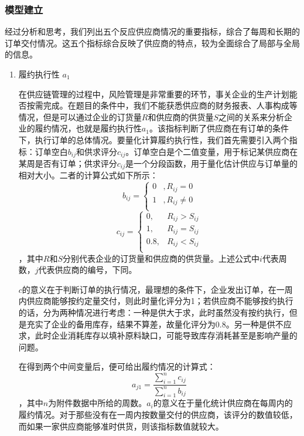 \documentclass{my_paper}
\begin{document}
\subsubsection{模型建立}
经过分析和思考，我们列出五个反应供应商情况的重要指标，综合了每周和长期的订单交付情况。这五个指标综合反映了供应商的特点，较为全面综合了局部与全局的信息。

\begin{enumerate}
    \item 履约执行性 $a_1$
    
    在供应链管理的过程中，风险管理\cite{1}是非常重要的环节，事关企业的生产计划能否按需完成。在题目的条件中，我们不能获悉供应商的财务报表、人事构成等情况，但是可以通过企业的订货量$R$和供应商的供货量$S$之间的关系来分析企业的履约情况，也就是履约执行性$a_1$。该指标判断了供应商在有订单的条件下，执行订单的总体情况。要量化计算履约执行性，我们首先需要引入两个指标：订单空白$b_{ij}$和供求评分$c_{ij}$。订单空白是个二值变量，用于标记某供应商在某周是否有订单；供求评分$c_{ij}$是一个分段函数，用于量化估计供应与订单量的相对大小。二者的计算公式如下所示：
    \begin{equation}
    b_{ij} = \begin{cases}
        0&,R_{ij}=0\\
        1&,R_{ij}\neq 0\\
    \end{cases}
    \label{bij}
    \end{equation}
    \begin{equation}
    c_{ij}=\begin{cases}
        0,&R_{ij}>S_{ij}\\
        1,&R_{ij}=S_{ij}\\
        0.8,&R_{ij}<S_{ij}\\
    \end{cases}
    \label{cij}
    \end{equation}
    ，其中$R$和$S$分别代表企业的订货量和供应商的供货量。上述公式中$i$代表周数，$j$代表供应商的编号，下同。
    
    $c$的意义在于判断订单的执行情况，最理想的条件下，企业发出订单，在一周内供应商能够按约定量交付，则此时量化评分为1；若供应商不能够按约执行的话，分为两种情况进行考虑：一种是供大于求，此时虽然没有按约执行，但是充实了企业的备用库存，结果不算差，故量化评分为$0.8$。另一种是供不应求，此时企业消耗库存以填补原料缺口，可能导致库存消耗甚至是影响产量的问题。
    
    在得到两个中间变量后，便可给出履约情况的计算式：
    \begin{equation}
    a_{j1}=\frac{\sum\limits^n_{i=1}c_{ij}}{\sum\limits^n_{i=1}b_{ij}}
    \label{aj1}
    \end{equation}
    ，其中$n$为附件数据中所给的周数。$a_i$的意义在于量化统计供应商在每周内的履约情况。对于那些没有在一周内按数量交付的供应商，该评分的数值较低，而如果一家供应商能够准时供货，则该指标数值就较大。


\end{enumerate}
\end{document}
